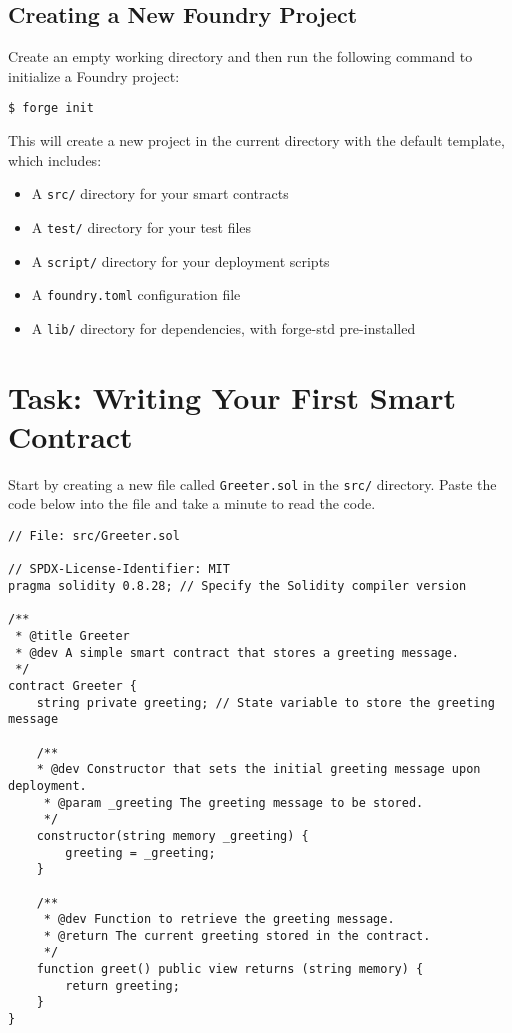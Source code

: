 \documentclass[12pt]{article}
\begin{document}
\subsection{Creating a New Foundry Project}

Create an empty working directory and then run the following command to initialize a Foundry project:

\begin{verbatim}
$ forge init
\end{verbatim}

This will create a new project in the current directory with the default template, which includes:
\begin{itemize}
    \item A \texttt{src/} directory for your smart contracts
    \item A \texttt{test/} directory for your test files
    \item A \texttt{script/} directory for your deployment scripts
    \item A \texttt{foundry.toml} configuration file
    \item A \texttt{lib/} directory for dependencies, with forge-std pre-installed
\end{itemize}

\section{Task: Writing Your First Smart Contract}

Start by creating a new file called \texttt{Greeter.sol} in the \texttt{src/} directory. Paste the code below into the file and take a minute to read the code.

\begin{lstlisting}[language=Solidity]
// File: src/Greeter.sol

// SPDX-License-Identifier: MIT
pragma solidity 0.8.28; // Specify the Solidity compiler version

/**
 * @title Greeter
 * @dev A simple smart contract that stores a greeting message.
 */
contract Greeter {
    string private greeting; // State variable to store the greeting message

    /**
    * @dev Constructor that sets the initial greeting message upon deployment.
     * @param _greeting The greeting message to be stored.
     */
    constructor(string memory _greeting) {
        greeting = _greeting;
    }

    /**
     * @dev Function to retrieve the greeting message.
     * @return The current greeting stored in the contract.
     */
    function greet() public view returns (string memory) {
        return greeting;
    }
}
\end{lstlisting}
\end{document}
